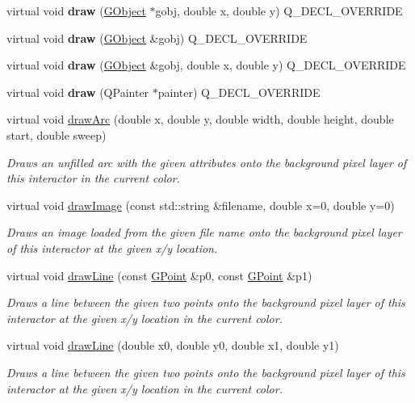 \begin{DoxyCompactItemize}
\item 
virtual void {\bfseries draw} (\mbox{\hyperlink{classGObject}{G\+Object}} $\ast$gobj, double x, double y) Q\+\_\+\+D\+E\+C\+L\+\_\+\+O\+V\+E\+R\+R\+I\+DE
\item 
virtual void {\bfseries draw} (\mbox{\hyperlink{classGObject}{G\+Object}} \&gobj) Q\+\_\+\+D\+E\+C\+L\+\_\+\+O\+V\+E\+R\+R\+I\+DE
\item 
virtual void {\bfseries draw} (\mbox{\hyperlink{classGObject}{G\+Object}} \&gobj, double x, double y) Q\+\_\+\+D\+E\+C\+L\+\_\+\+O\+V\+E\+R\+R\+I\+DE
\item 
virtual void {\bfseries draw} (Q\+Painter $\ast$painter) Q\+\_\+\+D\+E\+C\+L\+\_\+\+O\+V\+E\+R\+R\+I\+DE
\item 
virtual void \mbox{\hyperlink{classGDrawingSurface_a38b6fae1045191c57092b49905068144}{draw\+Arc}} (double x, double y, double width, double height, double start, double sweep)
\begin{DoxyCompactList}\small\item\em Draws an unfilled arc with the given attributes onto the background pixel layer of this interactor in the current color. \end{DoxyCompactList}\item 
virtual void \mbox{\hyperlink{classGDrawingSurface_abdd4cb1f2c64adc5d03522a1ee30febf}{draw\+Image}} (const std\+::string \&filename, double x=0, double y=0)
\begin{DoxyCompactList}\small\item\em Draws an image loaded from the given file name onto the background pixel layer of this interactor at the given x/y location. \end{DoxyCompactList}\item 
virtual void \mbox{\hyperlink{classGDrawingSurface_ae6a24b6b9a6e795d3165c1c750d5bdf1}{draw\+Line}} (const \mbox{\hyperlink{classGPoint}{G\+Point}} \&p0, const \mbox{\hyperlink{classGPoint}{G\+Point}} \&p1)
\begin{DoxyCompactList}\small\item\em Draws a line between the given two points onto the background pixel layer of this interactor at the given x/y location in the current color. \end{DoxyCompactList}\item 
virtual void \mbox{\hyperlink{classGDrawingSurface_aff299fe83178d2f3ce8c08c06b583484}{draw\+Line}} (double x0, double y0, double x1, double y1)
\begin{DoxyCompactList}\small\item\em Draws a line between the given two points onto the background pixel layer of this interactor at the given x/y location in the current color. \end{DoxyCompactList}\item 

\end{DoxyCompactItemize}

